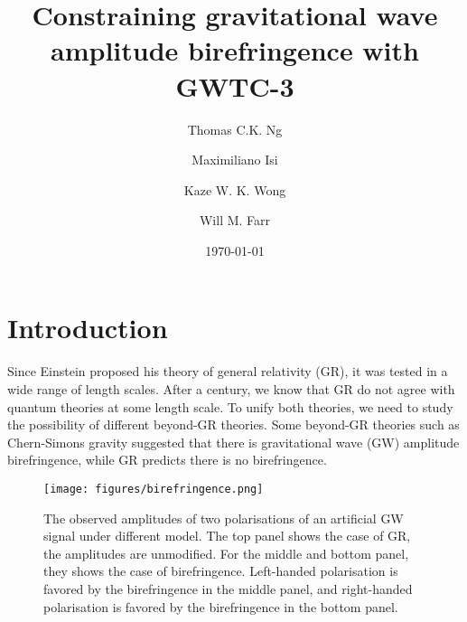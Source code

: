 \documentclass[twocolumn]{aastex631}
\begin{document}
\title{Constraining gravitational wave amplitude birefringence with GWTC-3}

\author{Thomas C.K. Ng}

\author{Maximiliano Isi}

\author{Kaze W. K. Wong}

\author{Will M. Farr}

\date{\today}

\begin{abstract}

\end{abstract}

\section{Introduction}

Since Einstein proposed his theory of general relativity (GR), it was tested in a wide range of length scales.
After a century, we know that GR do not agree with quantum theories at some length scale.
To unify both theories, we need to study the possibility of different beyond-GR theories.
Some beyond-GR theories such as Chern-Simons gravity suggested that there is gravitational wave (GW) amplitude birefringence,
while GR predicts there is no birefringence.

\begin{figure}[h!]
    \texttt{[image: figures/birefringence.png]}
    \caption{
        The observed amplitudes of two polarisations of an artificial GW signal under different model.
        The top panel shows the case of GR, the amplitudes are unmodified.
        For the middle and bottom panel, they shows the case of birefringence.
        Left-handed polarisation is favored by the birefringence in the middle panel,
        and right-handed polarisation is favored by the birefringence in the bottom panel.
    }
    \label{fig:birefringence}
\end{figure}
\end{document}
